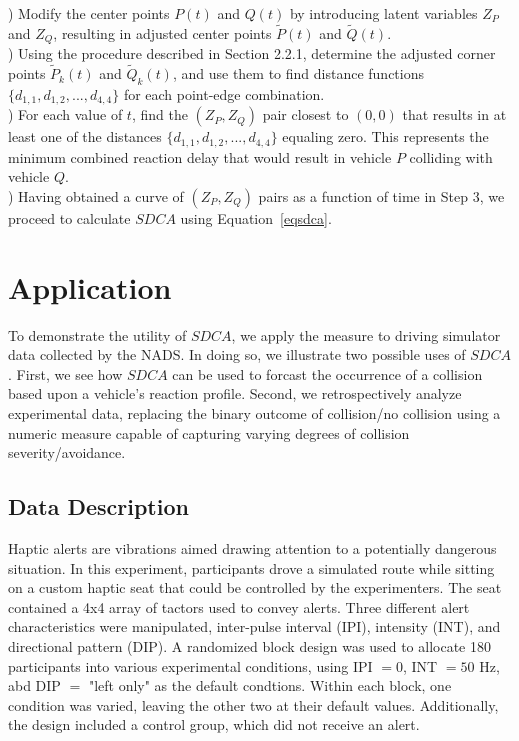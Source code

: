 \documentclass{article}
\begin{document}
) Modify the center points $P(t)$ and $Q(t)$ by introducing latent variables $Z_P$ and $Z_Q$, resulting in adjusted center points $\tilde{P}(t)$ and $\tilde{Q}(t)$. \\

) Using the procedure described in Section 2.2.1, determine the adjusted corner points $\tilde{P}_k(t)$ and $\tilde{Q}_k(t)$, and use them to find distance functions $\{d_{1,1}, d_{1,2}, ..., d_{4,4}\}$ for each point-edge combination. \\

) For each value of $t$, find the $(Z_P, Z_Q)$ pair closest to $(0,0)$ that results in at least one of the distances $\{d_{1,1}, d_{1,2}, ..., d_{4,4}\}$ equaling zero. This represents the minimum combined reaction delay that would result in vehicle $P$ colliding with vehicle $Q$. \\

) Having obtained a curve of $(Z_P, Z_Q)$ pairs as a function of time in Step 3, we proceed to calculate $SDCA$ using Equation~\eqref{eqsdca}.

\section{Application}

To demonstrate the utility of $SDCA$, we apply the measure to driving simulator data collected by the NADS. In doing so, we illustrate two possible uses of $SDCA$. First, we see how $SDCA$ can be used to forcast the occurrence of a collision based upon a vehicle's reaction profile. Second, we retrospectively analyze experimental data, replacing the binary outcome of collision/no collision using a numeric measure capable of capturing varying degrees of collision severity/avoidance.

\subsection{Data Description}

Haptic alerts are vibrations aimed drawing attention to a potentially dangerous situation. In this experiment, participants drove a simulated route while sitting on a custom haptic seat that could be controlled by the experimenters. The seat contained a 4x4 array of tactors used to convey alerts. Three different alert characteristics were manipulated, inter-pulse interval (IPI), intensity (INT), and directional pattern (DIP).  A randomized block design was used to allocate 180 participants into various experimental conditions, using IPI $= 0$, INT $= 50$ Hz, abd DIP $=$ "left only" as the default  condtions.  Within each block, one condition was varied, leaving the other two at their default values.  Additionally, the design included a control group, which did not receive an alert.
\end{document}
